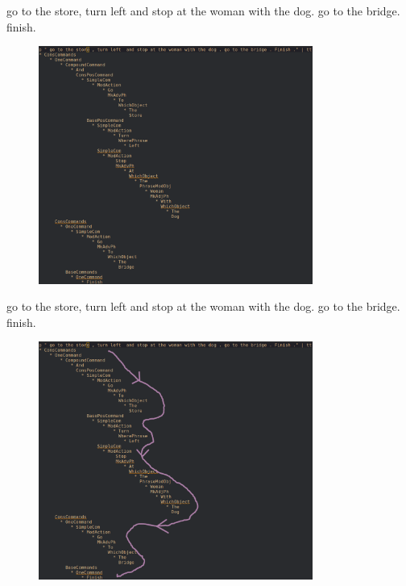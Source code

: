 \documentclass{beamer}
\begin{document}
\begin{frame}
\fontsize{9pt}{10pt}\selectfont
\begin{exampleblock}{}
go to the store, turn left and stop at the woman with the dog. go to the bridge. finish.
\end{exampleblock}

\begin{figure}

\centering
\includegraphics[width=90mm]{pics/wholeAST.png}
\end{figure}
\end{frame}

\begin{frame}
\fontsize{9pt}{10pt}\selectfont
\begin{exampleblock}{}
go to the store, turn left and stop at the woman with the dog. go to the bridge. finish.
\end{exampleblock}

\begin{figure}

\centering
\includegraphics[width=90mm]{pics/WithArrow.png}
\end{figure}
\end{frame}
\end{document}
